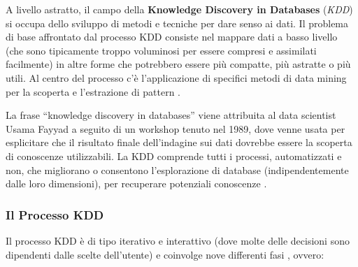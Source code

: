 A livello astratto, il campo della \textbf{Knowledge Discovery in Databases} (\textit{KDD}) si occupa dello sviluppo di metodi e tecniche per dare senso ai dati. Il problema di base affrontato dal processo KDD consiste nel mappare dati a basso livello (che sono tipicamente troppo voluminosi per essere compresi e assimilati facilmente) in altre forme che potrebbero essere più compatte, più astratte o più utili. Al centro del processo c'è l'applicazione di specifici metodi di data mining per la scoperta e l'estrazione di pattern \cite{from_data_mining_to_knowledge_discovery}.

La frase “knowledge discovery in databases” viene attribuita al data scientist Usama Fayyad a seguito di un workshop tenuto nel 1989, dove venne usata per esplicitare che il risultato finale dell'indagine sui dati dovrebbe essere la scoperta di conoscenze utilizzabili. La KDD comprende tutti i processi, automatizzati e non, che migliorano o consentono l'esplorazione di database (indipendentemente dalle loro dimensioni), per recuperare potenziali conoscenze \cite{knowledge_discovery_in_databases}.

\subsubsection{Il Processo KDD}

Il processo KDD è di tipo iterativo e interattivo (dove molte delle decisioni sono dipendenti dalle scelte dell'utente) e coinvolge nove differenti fasi \cite{researchgate_data_mining_and_knowledge}, ovvero:

